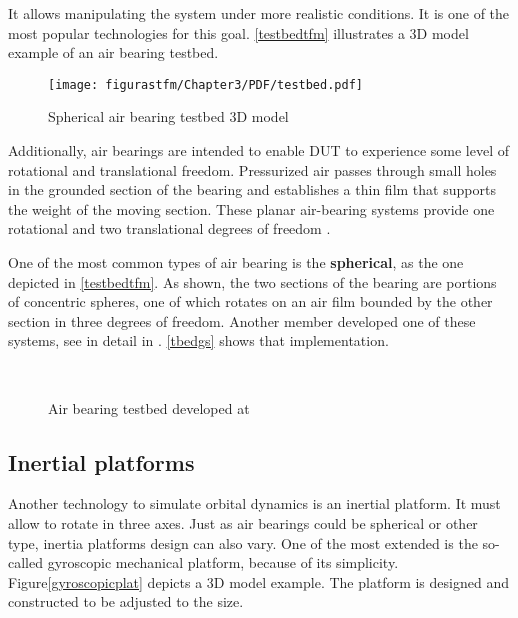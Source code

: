 It allows manipulating the system under more realistic conditions. It is one of the most popular technologies for this goal. \autoref{testbedtfm} illustrates a 3D model example of an air bearing testbed.

\begin{figure}[H]
			\centering
			\texttt{[image: figurastfm/Chapter3/PDF/testbed.pdf]}
			\caption{Spherical air bearing testbed 3D model \cite{tfmtestbed}}
			\label{testbedtfm}
			\vspace{-1cm}
		\end{figure}
		
		Additionally, air bearings are intended to enable \acrshort{DUT} to experience some level of rotational and translational freedom. Pressurized air passes through small holes in the grounded section of the bearing and establishes a thin film that supports the weight of the moving section. These planar air-bearing systems provide one rotational and two translational degrees of freedom \cite{airbearingreview}.
		
		One of the most common types of air bearing is the \textbf{spherical}, as the one depicted in \autoref{testbedtfm}. As shown, the two sections of the bearing are portions of concentric spheres, one of which rotates on an air film bounded by the other section in three degrees of freedom. Another  member developed one of these systems, see in detail in \cite{testbedgranasat}. \autoref{tbedgs} shows that implementation.

\begin{figure}[h]
			\centering
			 \\ 
			 \quad
			\caption{Air bearing testbed developed at  \cite{testbedgranasat}} \label{tbedgs}
\end{figure}


\subsection{Inertial platforms}

Another technology to simulate orbital dynamics is an inertial platform. It must allow  to rotate in three axes. Just as air bearings could be spherical or other type, inertia platforms design can also vary. One of the most extended is the so-called gyroscopic mechanical platform, because of its simplicity. Figure\autoref{gyroscopicplat} depicts a 3D model example. The platform is designed and constructed to be adjusted to the size. 


